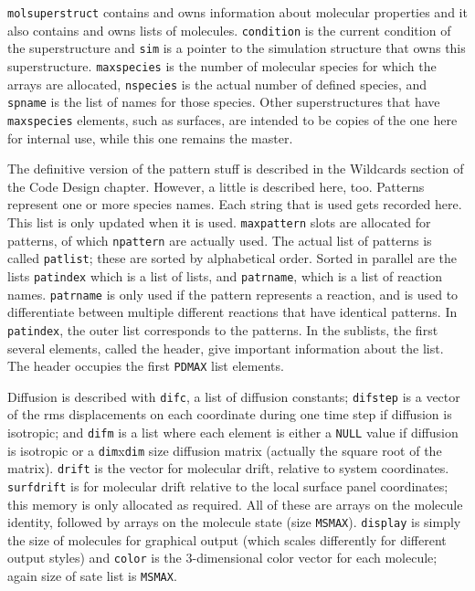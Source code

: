 \documentclass {book}
\begin{document}
\texttt{molsuperstruct} contains and owns information about molecular properties and it also contains and owns lists of molecules.  \texttt{condition} is the current condition of the superstructure and \texttt{sim} is a pointer to the simulation structure that owns this superstructure.  \texttt{maxspecies} is the number of molecular species for which the arrays are allocated, \texttt{nspecies} is the actual number of defined species, and \texttt{spname} is the list of names for those species.  Other superstructures that have \texttt{maxspecies} elements, such as surfaces, are intended to be copies of the one here for internal use, while this one remains the master.

The definitive version of the pattern stuff is described in the Wildcards section of the Code Design chapter.  However, a little is described here, too.  Patterns represent one or more species names.  Each string that is used gets recorded here.  This list is only updated when it is used.  \texttt{maxpattern} slots are allocated for patterns, of which \texttt{npattern} are actually used.  The actual list of patterns is called \texttt{patlist}; these are sorted by alphabetical order.  Sorted in parallel are the lists \texttt{patindex} which is a list of lists, and \texttt{patrname}, which is a list of reaction names.  \texttt{patrname} is only used if the pattern represents a reaction, and is used to differentiate between multiple different reactions that have identical patterns.  In \texttt{patindex}, the outer list corresponds to the patterns.  In the sublists, the first several elements, called the header, give important information about the list.  The header occupies the first \texttt{PDMAX} list elements.

Diffusion is described with \texttt{difc}, a list of diffusion constants; \texttt{difstep} is a vector of the rms displacements on each coordinate during one time step if diffusion is isotropic; and \texttt{difm} is a list where each element is either a \texttt{NULL} value if diffusion is isotropic or a \texttt{dim}x\texttt{dim} size diffusion matrix (actually the square root of the matrix).  \texttt{drift} is the vector for molecular drift, relative to system coordinates.  \texttt{surfdrift} is for molecular drift relative to the local surface panel coordinates; this memory is only allocated as required.  All of these are arrays on the molecule identity, followed by arrays on the molecule state (size \texttt{MSMAX}).  \texttt{display} is simply the size of molecules for graphical output (which scales differently for different output styles) and \texttt{color} is the 3-dimensional color vector for each molecule; again size of sate list is \texttt{MSMAX}.
\end{document}
